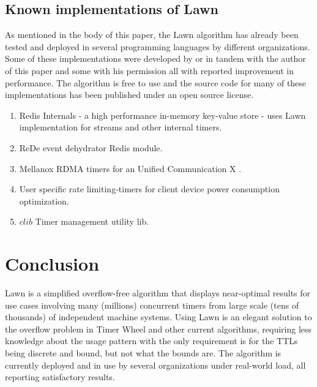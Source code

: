 \documentclass[conference]{IEEEtran}
\begin{document}
\subsection{Known implementations of Lawn}
As mentioned in the body of this paper, the Lawn algorithm has already been tested and deployed in several programming languages by different organizations. Some of these implementations were developed by or in tandem with the author of this paper and some with his permission all with reported improvement in performance. The algorithm is free to use and the source code for many of these implementations has been published under an open source license.
\begin{enumerate}
	\item Redis Internals \cite{Redis} - a high performance in-memory key-value store - uses Lawn implementation for streams and other internal timers.
	\item ReDe event dehydrator Redis module\cite{REDE}.
	\item Mellanox RDMA timers for an Unified Communication X\cite{MLNX} . 
	\item User specific rate limiting-timers for client device power consumption optimization\cite{VUSR}.
	\item $clib$ Timer management utility lib.
\end{enumerate}

\section{Conclusion}
Lawn is a simplified overflow-free algorithm that displays near-optimal results for use cases involving many (millions) concurrent timers from large scale (tens of thousands) of independent machine systems. 
Using Lawn is an elegant solution to the overflow problem in Timer Wheel and other current algorithms, requiring less knowledge about the usage pattern with the only requirement is for the TTLs being discrete and bound, but not what the bounds are.
The algorithm is currently deployed and in use by several organizations under real-world load, all reporting satisfactory results.




\end{document}
